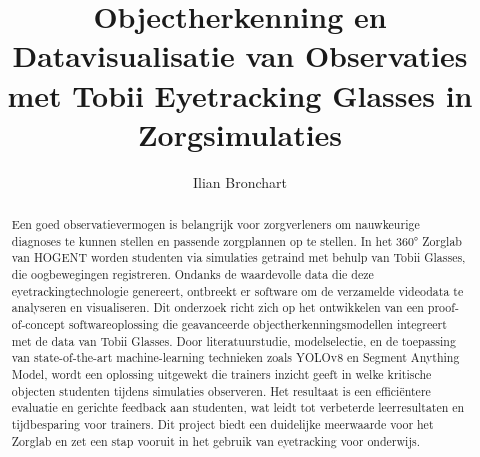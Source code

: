 \documentclass[dutch]{hogent-article}
\title{Objectherkenning en Datavisualisatie van Observaties met Tobii Eyetracking Glasses in Zorgsimulaties}
\author{Ilian Bronchart}
\begin{document}
\begin{abstract}
Een goed observatievermogen is belangrijk voor zorgverleners om nauwkeurige diagnoses te kunnen stellen en passende zorgplannen op te stellen. 
In het 360° Zorglab van HOGENT worden studenten via simulaties getraind met behulp van Tobii Glasses, die oogbewegingen registreren. 
Ondanks de waardevolle data die deze eyetrackingtechnologie genereert, ontbreekt er software om de verzamelde videodata te analyseren 
en visualiseren. Dit onderzoek richt zich op het ontwikkelen van een proof-of-concept softwareoplossing die geavanceerde objectherkenningsmodellen 
integreert met de data van Tobii Glasses. Door literatuurstudie, modelselectie, en de toepassing van state-of-the-art machine-learning technieken 
zoals YOLOv8 en Segment Anything Model, wordt een oplossing uitgewekt die trainers inzicht geeft in welke kritische objecten studenten tijdens simulaties observeren. 
Het resultaat is een efficiëntere evaluatie en gerichte feedback aan studenten, wat leidt tot verbeterde leerresultaten en tijdbesparing voor trainers. 
Dit project biedt een duidelijke meerwaarde voor het Zorglab en zet een stap vooruit in het gebruik van eyetracking voor onderwijs.
\end{abstract}

\tableofcontents



\printbibliography[heading=bibintoc]
\end{document}
